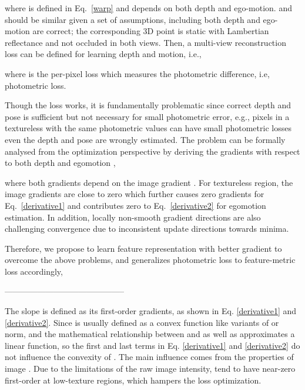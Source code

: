 \documentclass[runningheads]{llncs}
\begin{document}
where  is defined in Eq.~\ref{warp} and depends on both depth and ego-motion. 
 and  should be similar given a set of assumptions, including both depth and ego-motion are correct; the corresponding 3D point is static with Lambertian reflectance and not occluded in both views. 
Then, a multi-view reconstruction loss can be defined for learning depth and motion, i.e.,

where  is the per-pixel loss which measures the photometric difference, i.e, photometric loss.

Though the loss works, it is fundamentally problematic since correct depth and pose is sufficient but not necessary for small photometric error, e.g., pixels in a textureless with the same photometric values can have small photometric losses even the depth and pose are wrongly estimated.
The problem can be formally analysed from the optimization perspective by deriving the gradients with respect to both depth  and egomotion , 




where both gradients depend on the image gradient . For textureless region, the image gradients are close to zero which further causes zero gradients for Eq.~\ref{derivative1} and contributes zero to Eq.~\ref{derivative2} for egomotion estimation. In addition, locally non-smooth gradient directions are also challenging convergence due to inconsistent update directions towards minima. 

Therefore, we propose to learn feature representation  with better gradient  to overcome the above problems, and generalizes photometric loss to feature-metric loss accordingly,



\iffalse
--------------------------------------------






The slope is defined as its first-order gradients, as shown in Eq. \ref{derivative1} and \ref{derivative2}.
Since  is usually defined as a convex function like variants of  or  norm, and the mathematical relationship between  and  as well as  approximates a linear function, so the first and last terms in Eq. \ref{derivative1} and \ref{derivative2} do not influence the convexity of .
The main influence comes from the properties of image . 
Due to the limitations of the raw image intensity,  tend to have near-zero first-order at low-texture regions, which hampers the loss optimization.
\end{document}
